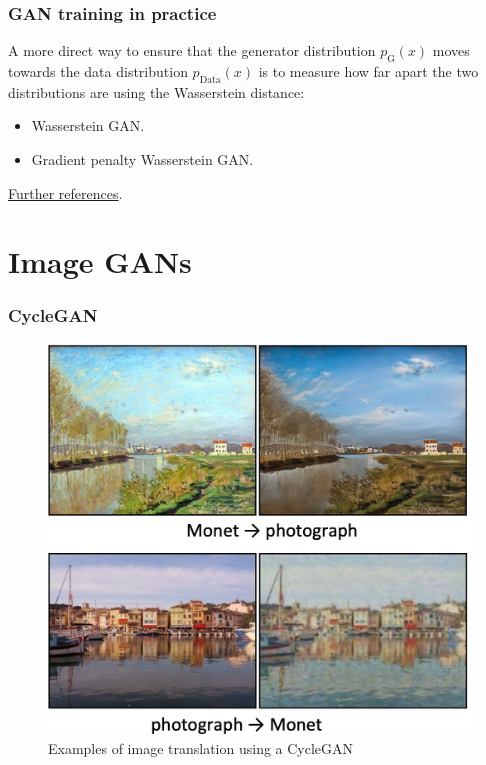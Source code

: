 \documentclass{beamer}
\begin{document}
\begin{frame}
    \frametitle{GAN training in practice}
    A more direct way to ensure that the generator distribution $p_{\textrm{G}}(x)$ moves towards the data distribution $p_{\textrm{Data}}(x)$ is to measure how far apart the two distributions are using the Wasserstein distance:
    \begin{itemize}
        \item Wasserstein GAN.
        \item Gradient penalty Wasserstein GAN.
    \end{itemize}
    \href{https://lilianweng.github.io/posts/2017-08-20-gan/}{Further references}.
\end{frame}

\section{Image GANs}

\begin{frame}
    \frametitle{CycleGAN}
    \begin{figure}
        \caption{Examples of image translation using a CycleGAN}
        \includegraphics[height=0.7\textheight]{Figure_6.png}
    \end{figure}
\end{frame}
\end{document}
